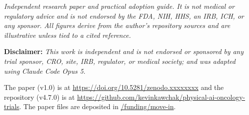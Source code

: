 \documentclass[11pt]{article}
\begin{document}
\vspace{-0.20em}
\mvrule{0.5pt}

\noindent\footnotesize\textit{Independent research paper and practical adoption
guide. It is not medical or regulatory advice and is not endorsed by the FDA,
NIH, HHS, an IRB, ICH, or any sponsor. All figures derive from the author's
repository sources and are illustrative unless tied to a cited
reference.}\normalsize\par

\vspace{0.15em}

\noindent\footnotesize\textbf{Disclaimer:} \textit{This work is independent and
is not endorsed or sponsored by any trial sponsor, CRO, site, IRB, regulator, or
medical society; and was adapted using Claude Code Opus 5.}\normalsize\par

\vspace{0.15em}

{\raggedright\noindent\footnotesize The paper (v1.0) is at
\href{https://doi.org/10.5281/zenodo.xxxxxxxx}{https://doi.org/10.5281/zenodo.xxxxxxxx}
and the repository (v4.7.0) is at
\href{https://github.com/kevinkawchak/physical-ai-oncology-trials}{https://github.com/kevinkawchak/physical-ai-oncology-trials}.
The paper files are deposited in
\href{https://github.com/kevinkawchak/physical-ai-oncology-trials/tree/main/funding/move-in}{/funding/move-in}.\normalsize\par}

\renewcommand{\keywordname}{\textbf{Keywords}}

\vspace{0.30em}
\mvrule{0.6pt}

\renewcommand{\contentsname}{Table of Contents}
{\setlength{\parskip}{0pt}\footnotesize\linespread{0.92}\selectfont\tableofcontents}

\vspace{-0.10em}
\mvrule{0.6pt}
\end{document}
